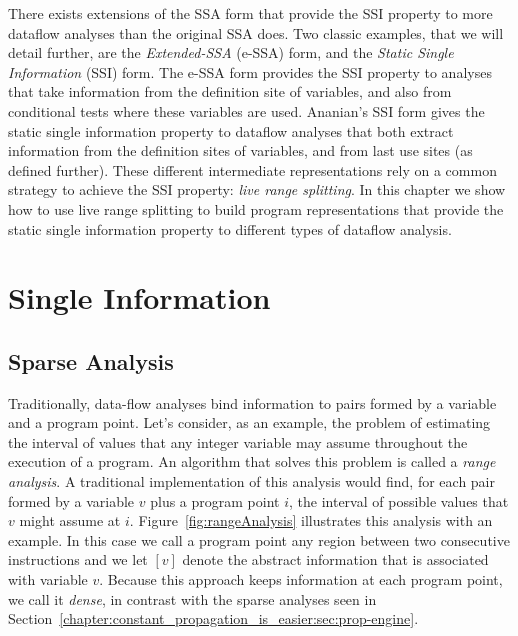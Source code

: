There exists extensions of the SSA form that provide the SSI property to more
dataflow analyses than the original SSA does.
Two classic examples, that we will detail further, are the {\em Extended-SSA} (e-SSA) form, and the {\em Static Single Information} (SSI) form.
The e-SSA form provides the SSI property to analyses that take information from
the definition site of variables, and also from conditional tests where these
variables are used.
Ananian's SSI form gives the static single information property to dataflow
analyses that both extract information from the definition sites of variables, and from last use sites (as defined further).
These different intermediate representations rely on a common strategy to achieve the SSI property: {\em live range splitting}.
In this chapter we show how to use live range splitting to build program
representations that provide the static single information property to different
types of dataflow analysis.

\section{Single Information}
\label{sec:ssi:pereira:single}



\subsection{Sparse Analysis}
\label{sec:ssi:pereira:sparse}

Traditionally, data-flow analyses bind information to pairs formed by a variable and a program point.
Let's consider, as an example, the problem of estimating the interval of values that any integer variable may assume throughout the execution of a program.
An algorithm that solves this problem is called a {\em range analysis}.
A traditional implementation of this analysis would find, for each pair formed by a variable $v$ plus a program point $i$, the interval of possible values that $v$ might assume at $i$.
Figure~\ref{fig:rangeAnalysis} illustrates this analysis with an example.
In this case we call a program point any region between two consecutive
instructions and we let $[v]$ denote the abstract information that is associated
with variable $v$.
Because this approach keeps information at each program point, we call it {\em dense}, in contrast with the sparse analyses seen in Section~\ref{chapter:constant_propagation_is_easier:sec:prop-engine}.

